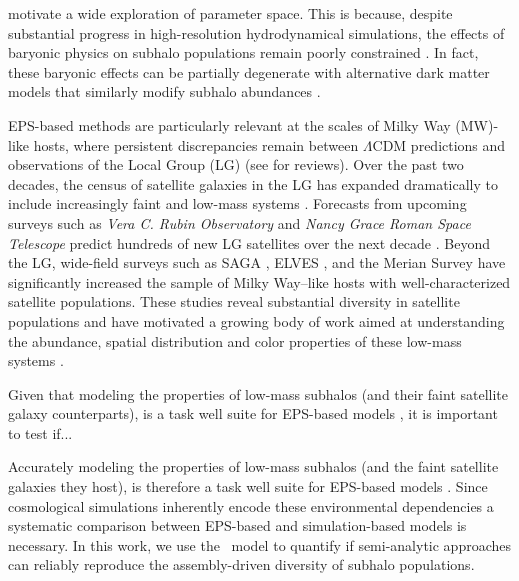 motivate a wide exploration of parameter space. This is because, despite substantial progress in high-resolution hydrodynamical simulations, the effects of baryonic physics on subhalo populations remain poorly constrained \citep{Garrison-Kimmel.etal.14, Wetzel.etal.16, Garrison-Kimmel.etal.17}. In fact, these baryonic effects can be partially degenerate with alternative dark matter models that similarly modify subhalo abundances \citep{Forouhar.etal.22, Nadler.etal.25}.

EPS-based methods are particularly relevant at the scales of Milky Way (MW)-like hosts, where persistent discrepancies remain between $\Lambda$CDM predictions and observations of the Local Group (LG) (see \citet{Bullock.BoylanKolchin.17, Sales.etal.22} for reviews). Over the past two decades, the census of satellite galaxies in the LG has expanded dramatically to include increasingly faint and low-mass systems \citep{Simon.19}. Forecasts from upcoming surveys such as \textit{Vera C. Rubin Observatory} and \textit{Nancy Grace Roman Space Telescope} predict hundreds of new LG satellites over the next decade \citep{Tan.etal.2026}. Beyond the LG, wide-field surveys such as SAGA \citep{Mao.etal.24}, ELVES \citep{Carlsten.etal.22}, and the Merian Survey \citep{Pan.etal.26} have significantly increased the sample of Milky Way–like hosts with well-characterized satellite populations. These studies reveal substantial diversity in satellite populations and have motivated a growing body of work aimed at understanding the abundance, spatial distribution and color properties of these low-mass systems \citep[e.g.][]{Wang.etal.21, Danieli.etal.23, Pan.etal.23, Kado-Fong.etal.25, Asali.etal.25}. 

Given that modeling the properties of low-mass subhalos (and their faint satellite galaxy counterparts), is a task well suite for EPS-based models \citep{Jiang.etal.21, Green.etal.21, Folsom.etal.2023, Monzon.etal.24, Dropulic.etal.25, Monzon.etal.26}, it is important to test if...

Accurately modeling the properties of low-mass subhalos (and the faint satellite galaxies they host), is therefore a task well suite for EPS-based models \citep{Jiang.etal.21, Green.etal.21, Folsom.etal.2023, Monzon.etal.24, Dropulic.etal.25, Monzon.etal.26}. Since cosmological simulations inherently encode these environmental dependencies a systematic comparison between EPS-based and simulation-based models is necessary. In this work, we use the \SatGen\ model \citep{Jiang.etal.21, Green.etal.21} to quantify if semi-analytic approaches can reliably reproduce the assembly-driven diversity of subhalo populations.

